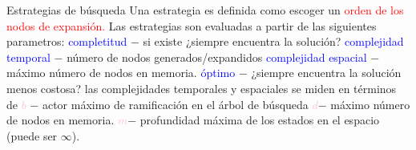 \begin{frame}{Estrategias de búsqueda}
Una estrategia es definida como escoger un  \textcolor{red}{orden de los nodos de expansión.} \newline
Las estrategias son evaluadas a partir de las siguientes parametros:\newline
\blank{1cm}\textcolor{blue}{completitud} $-$ si existe ¿siempre encuentra la solución? \newline
\blank{1cm}\textcolor{blue}{complejidad temporal} $-$ número de nodos generados/expandidos\newline
\blank{1cm}\textcolor{blue}{complejidad espacial} $-$ máximo número de nodos en memoria.\newline
\blank{1cm}\textcolor{blue}{óptimo} $-$ ¿siempre encuentra la solución menos costosa?\newline
las complejidades temporales y espaciales se miden en términos de\newline
\blank{1cm}\textcolor{pink}{$b$} $-$ actor máximo de ramificación en el árbol de búsqueda
\newline
\blank{1cm}\textcolor{pink}{$d$}$-$ máximo número de nodos en memoria.\newline
\blank{1cm}\textcolor{pink}{$m$}$-$ profundidad máxima de los estados en el espacio (puede ser $\infty$).\newline
\end{frame}
